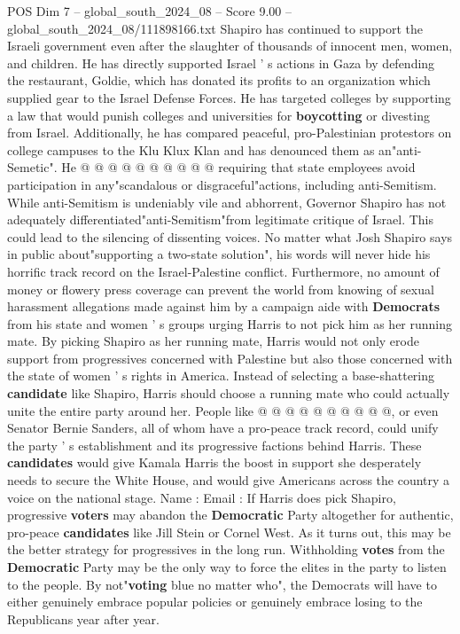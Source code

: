 \begin{textsample}{POS Dim 7 – global\_south\_2024\_08 – Score 9.00 – global\_south\_2024\_08/111898166.txt}
Shapiro has continued to support the Israeli government even after the slaughter of thousands of innocent men, women, and children.
He has directly supported Israel ' s actions in Gaza by defending the restaurant, Goldie, which has donated its profits to an organization which supplied gear to the Israel Defense Forces.
He has targeted colleges by supporting a law that would punish colleges and universities for \textbf{boycotting} or divesting from Israel.
Additionally, he has compared peaceful, pro-Palestinian protestors on college campuses to the Klu Klux Klan and has denounced them as an"anti-Semetic".
He @ @ @ @ @ @ @ @ @ @ requiring that state employees avoid participation in any"scandalous or disgraceful"actions, including anti-Semitism.
While anti-Semitism is undeniably vile and abhorrent, Governor Shapiro has not adequately differentiated"anti-Semitism"from legitimate critique of Israel.
This could lead to the silencing of dissenting voices.
No matter what Josh Shapiro says in public about"supporting a two-state solution", his words will never hide his horrific track record on the Israel-Palestine conflict.
Furthermore, no amount of money or flowery press coverage can prevent the world from knowing of sexual harassment allegations made against him by a campaign aide with \textbf{Democrats} from his state and women ' s groups urging Harris to not pick him as her running mate.
By picking Shapiro as her running mate, Harris would not only erode support from progressives concerned with Palestine but also those concerned with the state of women ' s rights in America.
Instead of selecting a base-shattering \textbf{candidate} like Shapiro, Harris should choose a running mate who could actually unite the entire party around her.
People like @ @ @ @ @ @ @ @ @ @, or even Senator Bernie Sanders, all of whom have a pro-peace track record, could unify the party ' s establishment and its progressive factions behind Harris.
These \textbf{candidates} would give Kamala Harris the boost in support she desperately needs to secure the White House, and would give Americans across the country a voice on the national stage.
Name : Email : If Harris does pick Shapiro, progressive \textbf{voters} may abandon the \textbf{Democratic} Party altogether for authentic, pro-peace \textbf{candidates} like Jill Stein or Cornel West.
As it turns out, this may be the better strategy for progressives in the long run.
Withholding \textbf{votes} from the \textbf{Democratic} Party may be the only way to force the elites in the party to listen to the people.
By not"\textbf{voting} blue no matter who", the Democrats will have to either genuinely embrace popular policies or genuinely embrace losing to the Republicans year after year.

\end{textsample}
